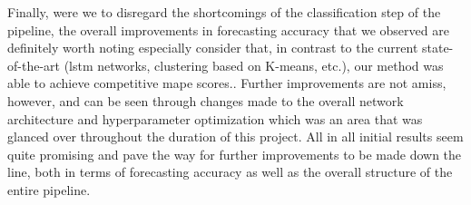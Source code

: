 \noindent \newline Finally, were we to disregard the shortcomings of the classification step of the pipeline, the overall improvements in forecasting accuracy that we observed are definitely worth noting especially consider that, in contrast to the current state-of-the-art (\gls{lstm} networks, clustering based on K-means, etc.), our method was able to achieve competitive \gls{mape} scores.. Further improvements are not amiss, however, and can be seen through changes made to the overall network architecture and hyperparameter optimization which was an area that was glanced over throughout the duration of this project. All in all initial results seem quite promising and pave the way for further improvements to be made down the line, both in terms of forecasting accuracy as well as the overall structure of the entire pipeline.